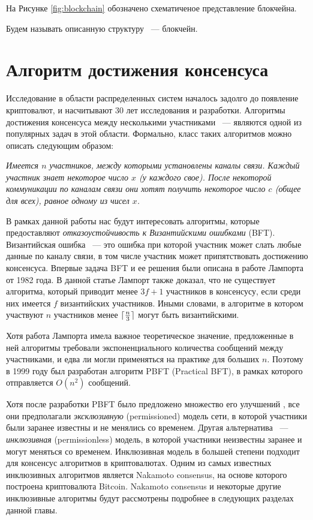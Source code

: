 На Рисунке \ref{fig:blockchain} обозначено схематиченое представление блокчейна.

Будем называть описанную структуру ~--- блокчейн.

\section{Алгоритм достижения консенсуса}
Исследование в области распределенных систем началось задолго до  появление криптовалют, и насчитывают 30 лет исследования и разработки.
Алгоритмы достижения консенсуса между несколькими участниками ~--- являются одной из популярных задач в этой области.
Формально, класс таких алгоритмов можно описать следующим образом:
\par \textit{
Имеется $n$ участников, между которыми установлены каналы связи. Каждый участник знает некоторое число $x$ (у каждого свое).
После некоторой коммуникации по каналам связи они хотят получить некоторое число $c$ (общее для всех),  равное одному из чисел $x$.
}

В рамках данной работы нас будут интересовать алгоритмы, которые предоставляют \textit{отказоустойчивость к Византийскими ошибками} (BFT)\cite{Lamport:1982}.
Византийская ошибка ~--- это ошибка при которой участник может слать любые данные по каналу связи, в том числе участник может припятствовать достижению консенсуса.
Впервые задача BFT и ее решения были описана в работе Лампорта от 1982 года\cite{Lamport:1982}. 
В данной статье Лампорт также доказал, что не существует алгоритма, который приводит менее $3f+1$ участников в консенсусу, если среди них имеется $f$  византийских участников.
Иными словами, в алгоритме в котором участвуют $n$ участников менее $\lceil\frac{n}{3}\rceil$ могут быть византийскими.

Хотя работа Лампорта имела важное теоретическое значение, предложенные в ней алгоритмы требовали экспоненциального количества сообщений между участниками, 
и едва ли могли применяться на практике для больших $n$. Поэтому в 1999 году был разработан алгоритм PBFT (Practical BFT)\cite{pbft},  в рамках которого отправляется $O(n^2)$  сообщений.

Хотя после разработки PBFT было предложено множество его улучшений \cite{qu, hq, Zyzzyva}, все они предполагали \textit{эксклюзивную} (permissioned) модель сети, 
в которой участники были заранее известны и не менялись со временем. Другая альтернатива ~--- \textit{инклюзивная} (permissionless) модель, в которой участники
неизвестны заранее и могут меняться со временем. Инклюзивная модель в большей степени подходит для консенсус алгоритмов в криптовалютах. Одним из самых известных инклюзивных алгоритмов является Nakamoto consensus\cite{nakamoto}, на основе которого построена криптовалюта Bitcoin. Nakamoto consensus и некоторые другие инклюзивные алгоритмы будут рассмотрены подробнее в следующих разделах данной главы.

